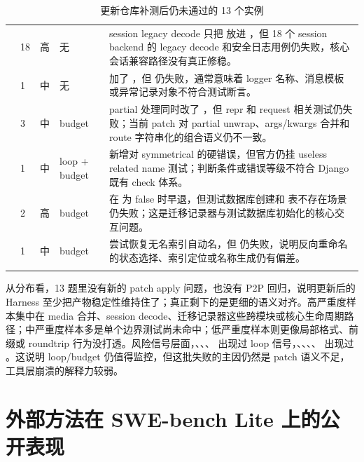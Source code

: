 \documentclass[UTF8,a4paper,11pt]{ctexart}
\begin{document}
\begin{center}
{\begin{longtable}{L{3.3cm} C{1.0cm} C{1.0cm} L{3.1cm} L{6.0cm}}
 & 18 & 高 & 无 & session legacy decode 只把  放进 ，但 18 个 session backend 的 legacy decode 和安全日志用例仍失败，核心会话兼容路径没有真正修稳。 \\
 & 1 & 中 & 无 &  加了 ，但  仍失败，通常意味着 logger 名称、消息模板或异常记录对象不符合测试断言。 \\
 & 3 & 中 & budget &  partial 处理同时改了 ，但 repr 和 request 相关测试仍失败；当前 patch 对 partial unwrap、args/kwargs 合并和 route 字符串化的组合语义仍不一致。 \\
 & 1 & 中 & loop + budget &  新增对 symmetrical  的硬错误，但官方仍挂 useless related name 测试；判断条件或错误等级不符合 Django 既有 check 体系。 \\
 & 2 & 高 & budget &  在  为 false 时早退，但测试数据库创建和  表不存在场景仍失败；这是迁移记录器与测试数据库初始化的核心交互问题。 \\
 & 1 & 中 & budget &  尝试恢复无名索引自动名，但  仍失败，说明反向重命名的状态选择、索引定位或名称生成仍有偏差。 \\
\bottomrule
\caption{更新仓库补测后仍未通过的 13 个实例}
\end{longtable}
}
\end{center}

从分布看，13 题里没有新的 patch apply 问题，也没有 P2P 回归，说明更新后的 Harness 至少把产物稳定性维持住了；真正剩下的是更细的语义对齐。高严重度样本集中在 media 合并、session decode、迁移记录器这些跨模块或核心生命周期路径；中严重度样本多是单个边界测试尚未命中；低严重度样本则更像局部格式、前缀或 roundtrip 行为没打透。风险信号层面，、、、 出现过 loop 信号，、、、、 出现过 。这说明 loop/budget 仍值得监控，但这批失败的主因仍然是 patch 语义不足，工具层崩溃的解释力较弱。

\section{外部方法在 SWE-bench Lite 上的公开表现}
\end{document}
